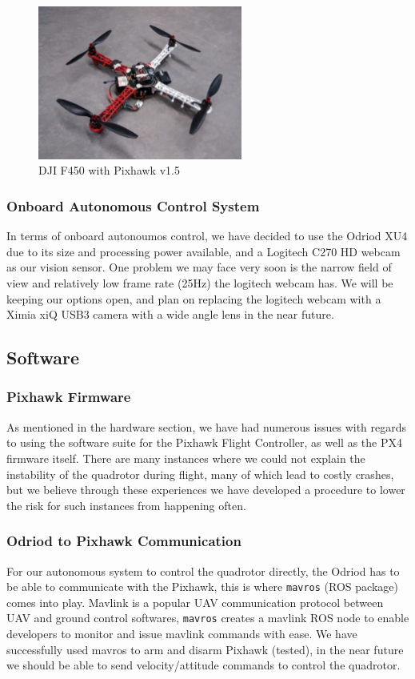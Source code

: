 \documentclass{article}[12pt]
\begin{document}
\begin{figure}[H]
	\centering
	\includegraphics[width=0.6\textwidth]{images/quadrotor.jpg}
	\caption{DJI F450 with Pixhawk v1.5}
\end{figure}

\subsubsection*{Onboard Autonomous Control System}
In terms of onboard autonoumos control, we have decided to use the Odriod 
XU4 due to its size and processing power available, and a Logitech C270 HD 
webcam as our vision sensor. One problem we may face very soon is the narrow 
field of view and relatively low frame rate (25Hz) the logitech webcam has. We 
will be keeping our options open, and plan on replacing the logitech webcam 
with a Ximia xiQ USB3 camera with a wide angle lens in the near 
future.



\subsection*{Software}
\subsubsection*{Pixhawk Firmware}
As mentioned in the hardware section, we have had numerous issues with 
regards to using the software suite for the Pixhawk Flight Controller, 
as well as the PX4 firmware itself. There are many instances where we could not 
explain the instability of the quadrotor during flight, many of which lead to 
costly crashes, but we believe through these experiences we have developed a 
procedure to lower the risk for such instances from happening often.

\subsubsection*{Odriod to Pixhawk Communication}
For our autonomous system to control the quadrotor directly, the Odriod has to 
be able to communicate with the Pixhawk, this is where \verb|mavros| (ROS 
package) comes into play. Mavlink is a popular UAV communication protocol 
between UAV and ground control softwares, \verb|mavros| creates a mavlink ROS 
node to enable developers to monitor and issue mavlink commands with ease. We 
have successfully used mavros to arm and disarm Pixhawk (tested), in the near 
future we should be able to send velocity/attitude commands to control the 
quadrotor.
\end{document}
